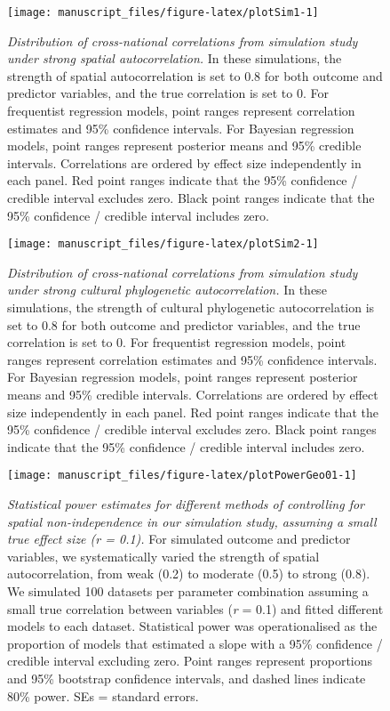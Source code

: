 \documentclass[
  man,floatsintext]{apa6}
\begin{document}
\newpage



\begin{figure}[H]
\texttt{[image: manuscript\_files/figure-latex/plotSim1-1]} \caption{\emph{Distribution of cross-national correlations from simulation study under strong spatial autocorrelation.} In these simulations, the strength of spatial autocorrelation is set to 0.8 for both outcome and predictor variables, and the true correlation is set to 0. For frequentist regression models, point ranges represent correlation estimates and 95\% confidence intervals. For Bayesian regression models, point ranges represent posterior means and 95\% credible intervals. Correlations are ordered by effect size independently in each panel. Red point ranges indicate that the 95\% confidence / credible interval excludes zero. Black point ranges indicate that the 95\% confidence / credible interval includes zero.}\label{fig:plotSim1}
\end{figure}

\newpage



\begin{figure}[H]
\texttt{[image: manuscript\_files/figure-latex/plotSim2-1]} \caption{\emph{Distribution of cross-national correlations from simulation study under strong cultural phylogenetic autocorrelation.} In these simulations, the strength of cultural phylogenetic autocorrelation is set to 0.8 for both outcome and predictor variables, and the true correlation is set to 0. For frequentist regression models, point ranges represent correlation estimates and 95\% confidence intervals. For Bayesian regression models, point ranges represent posterior means and 95\% credible intervals. Correlations are ordered by effect size independently in each panel. Red point ranges indicate that the 95\% confidence / credible interval excludes zero. Black point ranges indicate that the 95\% confidence / credible interval includes zero.}\label{fig:plotSim2}
\end{figure}

\newpage



\begin{figure}[H]
\texttt{[image: manuscript\_files/figure-latex/plotPowerGeo01-1]} \caption{\emph{Statistical power estimates for different methods of controlling for spatial non-independence in our simulation study, assuming a small true effect size (r = 0.1).} For simulated outcome and predictor variables, we systematically varied the strength of spatial autocorrelation, from weak (0.2) to moderate (0.5) to strong (0.8). We simulated 100 datasets per parameter combination assuming a small true correlation between variables (\emph{r} = 0.1) and fitted different models to each dataset. Statistical power was operationalised as the proportion of models that estimated a slope with a 95\% confidence / credible interval excluding zero. Point ranges represent proportions and 95\% bootstrap confidence intervals, and dashed lines indicate 80\% power. SEs = standard errors.}\label{fig:plotPowerGeo01}
\end{figure}
\end{document}

